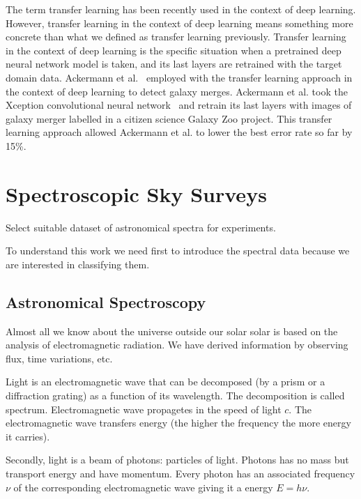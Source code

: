 \documentclass[thesis=M,english]{FITthesis}[2012/10/20]
\begin{document}
The term transfer learning has been recently used in the context of deep learning.
However, transfer learning in the context of deep learning means something more concrete than what we defined as transfer learning previously.
Transfer learning in the context of deep learning is the specific situation
when a pretrained deep neural network model is taken,
and its last layers are retrained with the target domain data.
Ackermann et al.~\cite{ackermann2018} employed with the transfer learning approach in the context of deep learning to detect galaxy merges.
Ackermann et al. took the Xception convolutional neural network~\cite{chollet2017}
and retrain its last layers with images of galaxy merger labelled in a citizen science Galaxy Zoo project.
This transfer learning approach allowed Ackermann et al. to lower the best error rate so far by 15\%.

\chapter{Spectroscopic Sky Surveys}
\label{data_chapter}


Select suitable dataset of astronomical spectra for experiments.

To understand this work we need first to introduce the spectral
data because we are interested in classifying them.

\section{Astronomical Spectroscopy}

Almost all we know about the universe outside our solar solar is based on the analysis of electromagnetic radiation.
We have derived information by observing flux, time variations, etc.~\cite{appenzeller2012}

Light is an electromagnetic wave that can be decomposed (by a prism or a diffraction grating) as a function of its wavelength.
The decomposition is called spectrum.
Electromagnetic wave propagetes in the speed of light \(c\).
The electromagnetic wave transfers energy
(the higher the frequency the more energy it carries).~\cite{cochard2018}

Secondly, light is a beam of photons: particles of light.
Photons has no mass but transport energy and have momentum.
Every photon has an associated frequency \(\nu\) of the corresponding electromagnetic wave giving it a energy \(E = h \nu\).
\end{document}
